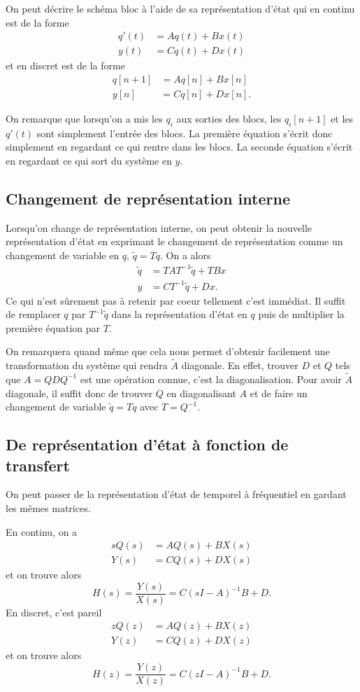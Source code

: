 On peut décrire le schéma bloc à l'aide de sa représentation d'état qui
en continu est de la forme
\begin{align*}
  q'(t) & = Aq(t) + Bx(t)\\
  y(t) & = Cq(t) + Dx(t)
\end{align*}
et en discret est de la forme
\begin{align*}
  q[n+1] & = Aq[n] + Bx[n]\\
  y[n] & = Cq[n] + Dx[n].
\end{align*}

On remarque que lorsqu'on a mis les $q_i$ aux sorties des blocs,
les $q_i[n+1]$ et les $q'(t)$ sont simplement l'entrée des blocs.
La première équation s'écrit donc simplement en regardant ce qui rentre
dans les blocs.
La seconde équation s'écrit en regardant ce qui sort du système en $y$.

\subsection{Changement de représentation interne}
Lorsqu'on change de représentation interne, on peut obtenir
la nouvelle représentation d'état en exprimant le changement de représentation
comme un changement de variable en $q$, $\tilde{q} = Tq$.
On a alors
\begin{align*}
  \tilde{q} & = TAT^{-1}\tilde{q} + TBx\\
  y & = CT^{-1}\tilde{q} + Dx.
\end{align*}
Ce qui n'est sûrement pas à retenir par coeur tellement c'est immédiat.
Il suffit de remplacer $q$ par $T^{-1}\tilde{q}$ dans la représentation d'état
en $q$ puis de multiplier la première équation par $T$.

On remarquera quand même que cela nous permet d'obtenir facilement une
transformation du système qui rendra $\tilde{A}$ diagonale.
En effet, trouver $D$ et $Q$ tels que $A = QDQ^{-1}$ est une opération connue,
c'est la diagonalisation.
Pour avoir $\tilde{A}$ diagonale,
il suffit donc de trouver $Q$ en diagonalisant $A$
et de faire un changement de variable $\tilde{q} = Tq$ avec $T = Q^{-1}$.

\subsection{De représentation d'état à fonction de transfert}
On peut passer de la représentation d'état de temporel à fréquentiel
en gardant les mêmes matrices.

En continu, on a
\begin{align*}
  sQ(s) & = AQ(s) + BX(s)\\
  Y(s) & = CQ(s) + DX(s)
\end{align*}
et on trouve alors
\[ H(s) = \frac{Y(s)}{X(s)} = C(sI-A)^{-1}B + D. \]
En discret, c'est pareil
\begin{align*}
  zQ(z) & = AQ(z) + BX(z)\\
  Y(z) & = CQ(z) + DX(z)
\end{align*}
et on trouve alors
\[ H(z) = \frac{Y(z)}{X(z)} = C(zI-A)^{-1}B + D. \]

